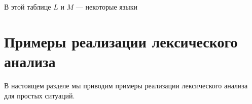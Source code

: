 \documentclass[12pt]{article}
\begin{document}
В этой таблице  $L$ и $M$ --- некоторые языки 	
\section{Примеры реализации лексического анализа}
В настоящем разделе мы приводим примеры реализации лексического анализа для простых ситуаций.
%
%
%
%
%
\end{document}
